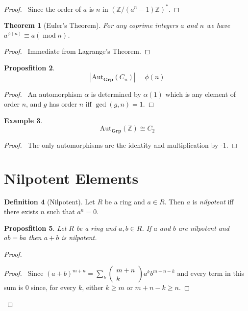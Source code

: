 \documentclass{book}
\let\qed\relax
\newtheorem{prop}{Proposfition}[chapter]
\newtheorem{thm}[prop]{Theorem}
\theoremstyle{definition}
\newtheorem{df}[prop]{Definition}
\newtheorem{ex}[prop]{Example}
\newcommand{\Aut}[2]{\ensuremath{\mathrm{Aut}_{#1} \left( {#2} \right)}}
\newcommand{\Grp}{\ensuremath{\mathbf{Grp}}}
\renewcommand{\mod}{\ensuremath{\operatorname{mod}}}
\begin{document}
\begin{proof}
\pf\ Since the order of $a$ is $n$ in $(\mathbb{Z} / (a^n - 1)\mathbb{Z})^*$. \qed
\end{proof}

\begin{thm}[Euler's Theorem]
For any coprime integers $a$ and $n$ we have $a^{\phi(n)} \equiv a (\mod n)$.
\end{thm}

\begin{proof}
\pf\ Immediate from Lagrange's Theorem. \qed
\end{proof}

\begin{prop}
    \[ |\Aut{\Grp}{C_n}| = \phi(n) \]
\end{prop}

\begin{proof}
    \pf\ An automorphism $\alpha$ is determined by $\alpha(1)$ which is any element of order $n$, and $g$ has order $n$ iff $\gcd(g,n) = 1$. \qed
\end{proof}

\begin{ex}
    \[ \Aut{\Grp}{\mathbb{Z}} \cong C_2 \]
\end{ex}

\begin{proof}
    \pf\ The only automorphisms are the identity and multiplication by -1. \qed
\end{proof}

\section{Nilpotent Elements}

\begin{df}[Nilpotent]
Let $R$ be a ring and $a \in R$. Then $a$ is \emph{nilpotent} iff there exists $n$ such that $a^n = 0$.
\end{df}

\begin{prop}
Let $R$ be a ring and $a,b \in R$. If $a$ and $b$ are nilpotent and $ab = ba$ then $a + b$ is nilpotent.
\end{prop}

\begin{proof}
\pf
{}
\begin{proof}
	\pf\ Since $(a+b)^{m+n} = \sum_k \left( \begin{array}{c} m + n \\ k \end{array} \right) a^k b^{m+n-k}$ and every term in this sum is 0 since, for every $k$, either $k \geq m$ or $m+n-k \geq n$.
\end{proof}
\qed
\end{proof}
\end{document}
